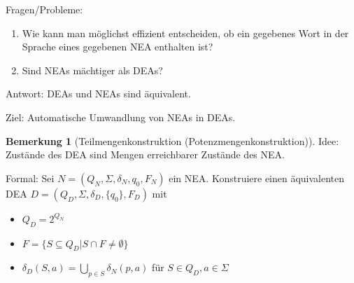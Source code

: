 \documentclass[11pt]{article} %
\theoremstyle{definition}
\newtheorem*{bemerkung}{Bemerkung}
\begin{document}
Fragen/Probleme:
\begin{enumerate}
\item Wie kann man möglichst effizient entscheiden, ob ein gegebenes Wort in der Sprache eines gegebenen NEA enthalten ist?
\item Sind NEAs mächtiger als DEAs?
\end{enumerate}

Antwort: DEAs und NEAs sind äquivalent.

Ziel: Automatische Umwandlung von NEAs in DEAs.

\begin{bemerkung}[Teilmengenkonstruktion (Potenzmengenkonstruktion)]
Idee: Zustände des DEA sind Mengen erreichbarer Zustände des NEA.

Formal: Sei $N = (Q_N, \Sigma, \delta_N, q_0, F_N)$ ein NEA. Konstruiere einen äquivalenten DEA $D = (Q_D, \Sigma, \delta_D, \{q_0\}, F_D)$ mit
\begin{itemize}
\item $Q_D = 2^{Q_N}$
\item $F = \{S \subseteq Q_D | S\cap F \neq \emptyset \}$
\item $\delta_D(S, a) = \bigcup\limits_{p \in S} \delta_N(p, a)$ für $S \in Q_D, a \in \Sigma$
\end{itemize}
\end{bemerkung}
\end{document}
